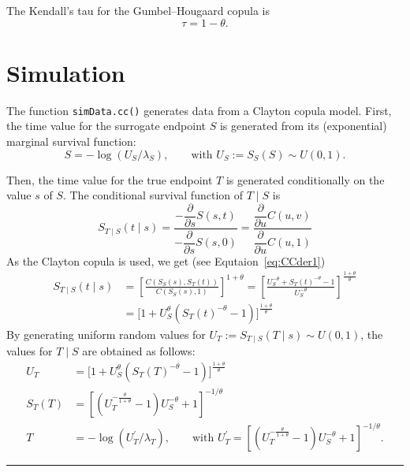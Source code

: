 \documentclass{article}
\begin{document}
The Kendall's tau for the Gumbel--Hougaard copula is
\begin{equation}
    \tau = 1 - \theta.
\end{equation}


\section*{Simulation}
The function \texttt{simData.cc()} generates data from a Clayton copula model.
First, the time value for the surrogate endpoint $S$ is generated
  from its (exponential) marginal survival function:
  \begin{equation}
    S = -\log(U_S / \lambda_S), \qquad\text{with }
      U_S := S_S(S) \sim U(0,1).
  \end{equation}

Then, the time value for the true endpoint $T$ is generated conditionally
  on the value $s$ of $S$.
The conditional survival function of $T\mid S$ is
  \begin{equation}
    S_{T\mid S}(t\mid s) 
    = \frac{
        - \dfrac{\partial}{\partial s} S(s, t)
      }{
        - \dfrac{\partial}{\partial s} S(s, 0)
      }
      = \frac{
        \dfrac{\partial}{\partial u} C(u, v)
      }{
        \dfrac{\partial}{\partial u} C(u, 1)
      }
  \end{equation}
As the Clayton copula is used, we get (see Equtaion~\ref{eq:CCder1})
  \begin{align}
    \nonumber
    S_{T\mid S}(t\mid s) 
    &= \left[\frac{
        C(S_S(s), S_T(t))
      }{
        C(S_S(s), 1)
      }\right]^{1 + \theta}
    = \left[\frac{
        U_S^{-\theta} + S_T(t)^{-\theta} - 1
      }{
        U_S^{-\theta}
      }\right]^{\frac{1 + \theta}\theta}\\
    &= \Big[1 + 
        U_S^\theta (S_T(t)^{-\theta} - 1)
        \Big]^{\frac{1 + \theta}\theta}
  \end{align}
By generating uniform random values for 
  $U_T := S_{T\mid S}(T\mid s)\sim U(0,1)$,
  the values for $T\mid S$ are obtained as follows:
  \begin{align}
    \nonumber
    U_T &= \Big[1 + 
      U_S^\theta (S_T(T)^{-\theta} - 1)
      \Big]^{\frac{1 + \theta}\theta}
    \\ \nonumber
    S_T(T) &= \left[
      \left(U_T^{-\frac\theta{1+\theta}} - 1\right) U_S^{-\theta} + 1
      \right]^{-1 / \theta}
    \\ 
    T &= -\log(U^\prime_T / \lambda_T),  \qquad\text{with }
      U^\prime_T = \left[
      \left(U_T^{-\frac\theta{1+\theta}} - 1\right) U_S^{-\theta} + 1
      \right]^{-1 / \theta}.
  \end{align}

  

\hrule
\nocite{Nelsen06}


{}
\end{document}
